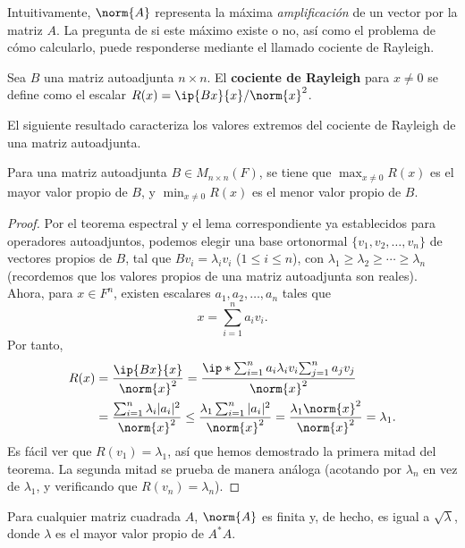 Intuitivamente, $\norm{A}$ representa la máxima \textit{amplificación} de un vector por la matriz $A$. La pregunta de si este máximo existe o no, así como el problema de cómo calcularlo, puede responderse mediante el llamado cociente de Rayleigh.

\begin{definicion}
    Sea $B$ una matriz autoadjunta $n\times n$. El \textbf{cociente de Rayleigh} para $x\neq 0$ se define como el escalar $R(x)=\ip{Bx}{x}/\norm{x}^2$.
\end{definicion}

El siguiente resultado caracteriza los valores extremos del cociente de Rayleigh de una matriz autoadjunta.

\begin{teorema}
    Para una matriz autoadjunta $B\in M_{n\times n}(F)$, se tiene que $\max_{x\neq 0}R(x)$ es el mayor valor propio de $B$, y $\min_{x\neq 0}R(x)$ es el menor valor propio de $B$.
\end{teorema}

\begin{proof}
    Por el teorema espectral y el lema correspondiente ya establecidos para operadores autoadjuntos, podemos elegir una base ortonormal $\{v_1,v_2,\dots,v_n\}$ de vectores propios de $B$, tal que $Bv_i=\lambda_iv_i$ ($1\leq i\leq n$), con $\lambda_1\geq\lambda_2\geq\cdots\geq\lambda_n$ (recordemos que los valores propios de una matriz autoadjunta son reales). Ahora, para $x\in F^n$, existen escalares $a_1,a_2,\dots,a_n$ tales que
    \begin{equation*}
        x=\sum_{i=1}^{n}a_iv_i.
    \end{equation*}
    Por tanto,
    \begin{align*}
        R(x)&=\frac{\ip{Bx}{x}}{\norm{x}^2}=\frac{\ip*{\sum_{i=1}^{n}a_i\lambda_iv_i}{\sum_{j=1}^{n}a_jv_j}}{\norm{x}^2}\\
        &=\frac{\sum_{i=1}^{n}\lambda_i|a_i|^2}{\norm{x}^2}\leq\frac{\lambda_1\sum_{i=1}^{n}|a_i|^2}{\norm{x}^2}=\frac{\lambda_1\norm{x}^2}{\norm{x}^2}=\lambda_1.
    \end{align*}
    Es fácil ver que $R(v_1)=\lambda_1$, así que hemos demostrado la primera mitad del teorema. La segunda mitad se prueba de manera análoga (acotando por $\lambda_n$ en vez de $\lambda_1$, y verificando que $R(v_n)=\lambda_n$).
\end{proof}

\begin{corolario}
    Para cualquier matriz cuadrada $A$, $\norm{A}$ es finita y, de hecho, es igual a $\sqrt\lambda$, donde $\lambda$ es el mayor valor propio de $A^*A$.
\end{corolario}

